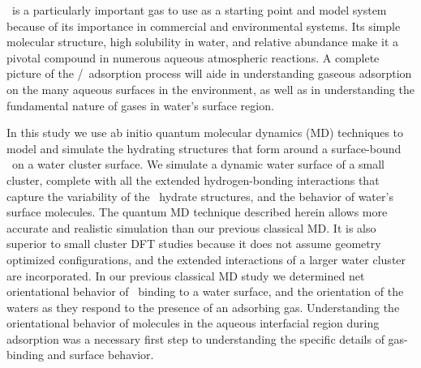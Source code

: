 \documentclass{article}
\begin{document}
\suldiox~is a particularly important gas to use as a starting point and model system because of its importance in commercial and environmental systems. \cite{Boniface2000,Jayne1990,Johns2011,Heber1997,Faloona2009,Clegg2001} Its simple molecular structure, high solubility in water, and relative abundance make it a pivotal compound in numerous aqueous atmospheric reactions. A complete picture of the \suldiox/\wat~adsorption process will aide in understanding gaseous adsorption on the many aqueous surfaces in the environment, as well as in understanding the fundamental nature of gases in water's surface region. 

In this study we use ab initio quantum molecular dynamics (MD) techniques to model and simulate the hydrating structures that form around a surface-bound \suldiox~on a water cluster surface. We simulate a dynamic water surface of a small cluster, complete with all the extended hydrogen-bonding interactions that capture the variability of the \suldiox~hydrate structures, and the behavior of water's surface molecules. The quantum MD technique described herein allows more accurate and realistic simulation than our previous classical MD.\cite{Shamay2011} It is also superior to small cluster DFT studies because it does not assume geometry optimized configurations, and the extended interactions of a larger water cluster are incorporated. In our previous classical MD study we determined net orientational behavior of \suldiox~binding to a water surface, and the orientation of the waters as they respond to the presence of an adsorbing gas. Understanding the orientational behavior of molecules in the aqueous interfacial region during adsorption was a necessary first step to understanding the specific details of gas-binding and surface behavior. 

\end{document}
